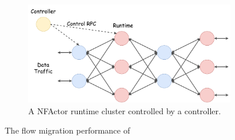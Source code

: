 \begin{figure}[!t]
   \begin{subfigure}[t]{0.99\linewidth}
  \centering
    \includegraphics[width=\columnwidth]{figure/nfactor-cluster.pdf}
    \caption{A NFActor runtime cluster controlled by a controller.}\label{fig:rep-recovery} \end{subfigure}
 \caption{The flow migration performance of \nfactor}
\label{fig:rep-perf}
\end{figure}
